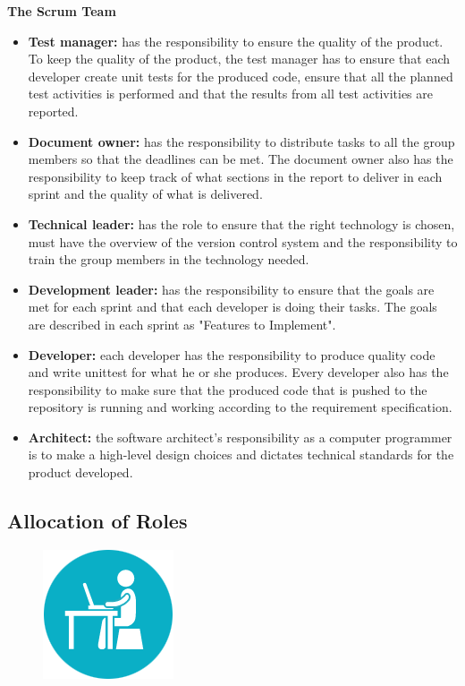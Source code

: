 \noindent
{\bf The Scrum Team}
\begin{itemize}

  \item {\bf Test manager:} has the responsibility to ensure the quality of the product. To keep the quality of the product, the test manager has to ensure that each developer create unit tests for the produced code, ensure that all the planned test activities is performed and that the results from all test activities are reported.

  \item {\bf Document owner:} has the responsibility to distribute tasks to all the group members so that the deadlines can be met. The document owner also has the responsibility to keep track of what sections in the report to deliver in each sprint and the quality of what is delivered.

  \item {\bf Technical leader:} has the role to ensure that the right technology is chosen, must have the overview of the version control system and the responsibility to train the group members in the technology needed.

  \item {\bf Development leader:} has the responsibility to ensure that the goals are met for each sprint and that each developer is doing their tasks. The goals are described in each sprint as "Features to Implement". 

  \item {\bf Developer:} each developer has the responsibility to produce quality code and write unittest for what he or she produces. Every developer also has the responsibility to make sure that the produced code that is pushed to the repository is running and working according to the requirement specification.

  \item{\bf Architect:} the software architect's responsibility as a computer programmer is to make a high-level design choices and dictates technical standards for the product developed. \cite{architect}

  \end{itemize} 

\subsection{Allocation of Roles}
\begin{figure}
  \begin{center}
  \includegraphics[scale=0.7]{pictures/Work.png}
  \end{center}
\end{figure}

